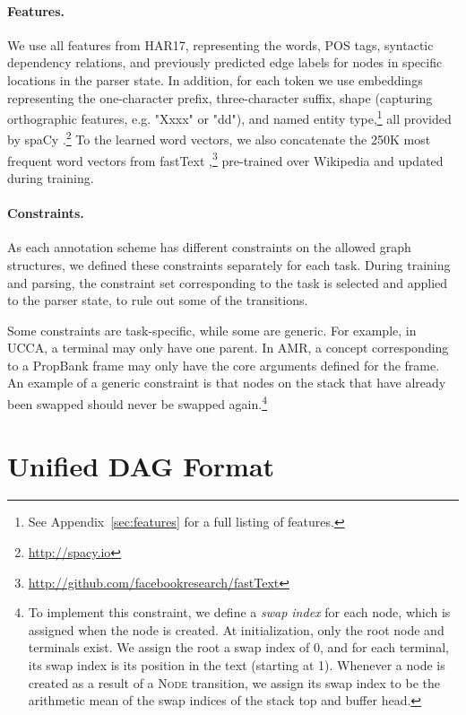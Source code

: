\documentclass[11pt,a4paper]{article}
\begin{document}
\paragraph{Features.}
We use all features from HAR17,
representing the words, POS tags, syntactic dependency relations, and previously predicted edge labels
for nodes in specific locations in the parser state.
In addition, for each token
we use embeddings representing the one-character prefix, three-character suffix,
shape (capturing orthographic features, e.g. "Xxxx" or "dd"),
and named entity type,\footnote{See Appendix~\ref{sec:features} for a full listing of features.}
all provided by spaCy \cite{spacy2}.\footnote{\url{http://spacy.io}}
To the learned word vectors, we also concatenate the 250K most frequent word vectors from fastText
\cite{bojanowski2016enriching},\footnote{\mbox{\url{http://github.com/facebookresearch/fastText}}}
pre-trained over Wikipedia and updated during training.


\paragraph{Constraints.}
As each annotation scheme has different constraints on the allowed graph structures,
we defined these constraints separately for each task.
During training and parsing, the constraint set corresponding to the task is
selected and applied to the parser state, to rule out some of the transitions.

Some constraints are task-specific, while some are generic.
For example, in UCCA, a terminal may only have one parent.
In AMR, a concept corresponding to a PropBank frame may only have 
the core arguments defined for the frame.
An example of a generic constraint is that nodes on the stack 
that have already been swapped
should never be swapped again.\footnote{
 To implement this constraint, we define a \textit{swap index}
 for each node, which is assigned when the node is created.
 At initialization, only the root node and terminals exist.
 We assign the root a swap index of 0, and for each terminal, its swap index
 is its position in the text (starting at 1).
 Whenever a node is created as a result of a \textsc{Node}
 transition, we assign its swap index to be the arithmetic 
 mean of the swap indices of the stack top and buffer head.}


\section{Unified DAG Format}\label{sec:format}
\end{document}
